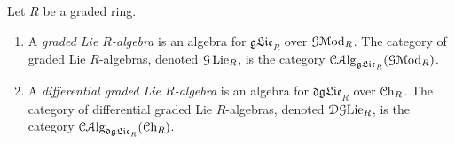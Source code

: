 \begin{definition}\label{2.3.8}
	Let $R$ be a graded ring.
	\begin{enumerate}[align=left, label=(\arabic*)]
		\item A \emph{graded Lie $R$-algebra} is an algebra for $\mathfrak{gLie}_R$ over $\mathcal{G} \mathcal{M}\mathrm{od} _R$. The category of graded Lie $R$-algebras, denoted $\mathcal{G} \operatorname{Lie} _R$, is the category $\mathcal{C}\mathcal{A}\mathrm{lg}_{\mathfrak{gLie}_R} (\mathcal{G} \mathcal{M}\mathrm{od} _R)$.
		\item A \emph{differential graded Lie $R$-algebra} is an algebra for $\mathfrak{dgLie} _R$ over $\mathcal{C}\mathrm{h}_{R} $. The category of differential graded Lie $R$-algebras, denoted $\mathcal{DG}\mathrm{Lie} _R$, is the category $\mathcal{C}\mathcal{A}\mathrm{lg}_{\mathfrak{dgLie}_R} (\mathcal{C}\mathrm{h}_{R} )$.
	\end{enumerate}
\end{definition}

